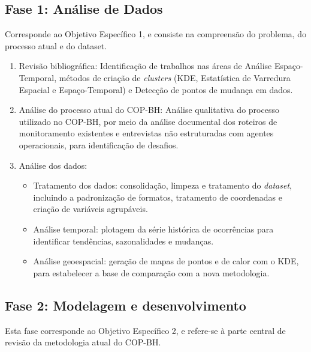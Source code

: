 

\subsection{Fase 1: Análise de Dados}

Corresponde ao Objetivo Específico 1, e consiste na compreensão do problema, do processo atual e do dataset.

\begin{enumerate}
  \item{Revisão bibliográfica: Identificação de trabalhos nas áreas de Análise Espaço-Temporal, métodos de criação de \textit{clusters} (KDE, Estatística de Varredura Espacial e Espaço-Temporal) e Detecção de pontos de mudança em dados.}
  \item{Análise do processo atual do COP-BH: Análise qualitativa do processo utilizado no COP-BH, por meio da análise documental dos roteiros de monitoramento existentes e entrevistas não estruturadas com agentes operacionais, para identificação de desafios.} 
  \item{Análise dos dados:}
  \begin{itemize}
    \item{Tratamento dos dados: consolidação, limpeza e tratamento do \textit{dataset}, incluindo a padronização de formatos, tratamento de coordenadas e criação de variáveis agrupáveis.}
    \item{Análise temporal: plotagem da série histórica de ocorrências para identificar tendências, sazonalidades e mudanças.}
    \item{Análise geoespacial: geração de mapas de pontos e de calor com o KDE, para estabelecer a base de comparação com a nova metodologia.}
  \end{itemize}
\end{enumerate}

\subsection{Fase 2: Modelagem e desenvolvimento}

Esta fase corresponde ao Objetivo Específico 2, e refere-se à parte central de revisão da metodologia atual do COP-BH.

